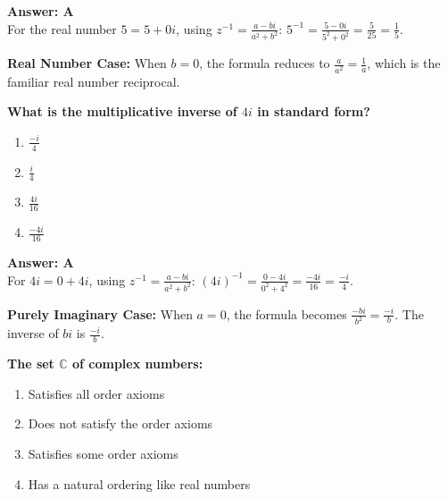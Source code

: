 \documentclass[12pt,a4paper]{article}
\begin{document}
\begin{answerstyle}
\textbf{Answer: A} \\
For the real number \( 5 = 5 + 0i \), using \( z^{-1} = \frac{a - bi}{a^2 + b^2} \): \( 5^{-1} = \frac{5 - 0i}{5^2 + 0^2} = \frac{5}{25} = \frac{1}{5} \).
\end{answerstyle}

\begin{conceptbox}
\textbf{Real Number Case:} When \( b = 0 \), the formula reduces to \( \frac{a}{a^2} = \frac{1}{a} \), which is the familiar real number reciprocal.
\end{conceptbox}

\newpage
\begin{questiontitle}[MCQ 66]
\textbf{What is the multiplicative inverse of \( 4i \) in standard form?}
\end{questiontitle}

\begin{partbox}[Options]
\begin{enumerate}[label=\Alph*.]
    \item \( \frac{-i}{4} \)
    \item \( \frac{i}{4} \)
    \item \( \frac{4i}{16} \)
    \item \( \frac{-4i}{16} \)
\end{enumerate}
\end{partbox}

\begin{answerstyle}
\textbf{Answer: A} \\
For \( 4i = 0 + 4i \), using \( z^{-1} = \frac{a - bi}{a^2 + b^2} \): \( (4i)^{-1} = \frac{0 - 4i}{0^2 + 4^2} = \frac{-4i}{16} = \frac{-i}{4} \).
\end{answerstyle}

\begin{conceptbox}
\textbf{Purely Imaginary Case:} When \( a = 0 \), the formula becomes \( \frac{-bi}{b^2} = \frac{-i}{b} \). The inverse of \( bi \) is \( \frac{-i}{b} \).
\end{conceptbox}

\newpage
\begin{questiontitle}[MCQ 67]
\textbf{The set \( \mathbb{C} \) of complex numbers:}
\end{questiontitle}

\begin{partbox}[Options]
\begin{enumerate}[label=\Alph*.]
    \item Satisfies all order axioms
    \item Does not satisfy the order axioms
    \item Satisfies some order axioms
    \item Has a natural ordering like real numbers
\end{enumerate}
\end{partbox}
\end{document}
